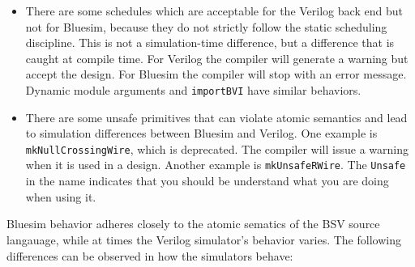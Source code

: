 \documentclass{article}
\newcommand{\te}[1]{\texttt{#1}}
\begin{document}
\begin{itemize}
\item  There are some schedules which are acceptable for the Verilog
back end but not for Bluesim, because they do not strictly follow the
static scheduling discipline.  This is not a simulation-time
difference, but a difference that is caught at compile time.  For
Verilog the compiler will generate a warning but accept the design.
For Bluesim the compiler will stop with an error message.  Dynamic
module arguments and \te{importBVI} have similar behaviors.

\item There are some unsafe primitives that can violate atomic
semantics and lead to simulation differences between Bluesim and
Verilog.  One example is \te{mkNullCrossingWire}, which is deprecated.
 The compiler will issue a warning when it is used in a design.
Another example is \te{mkUnsafeRWire}. The \te{Unsafe} in the name
indicates that you should be understand what you are doing when using it.

\end{itemize}

Bluesim behavior adheres closely to the atomic sematics of the BSV
source langauage, while at times the Verilog simulator's behavior
varies.  The following differences can be observed in how the
simulators behave:
\end{document}

